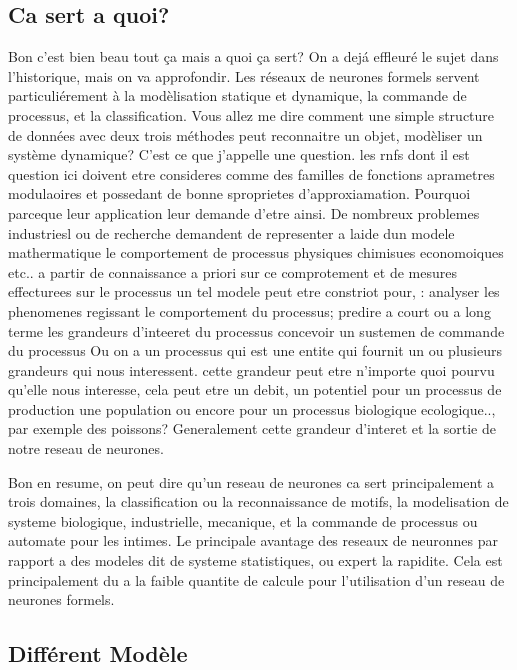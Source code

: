 \documentclass[a4paper,12pt]{report}
\begin{document}
\subsection{Ca sert a quoi?}
Bon c'est bien beau tout \c ca mais a quoi  \c ca sert? On a
dej\'a effleur\'e le sujet dans l'historique, mais on va
approfondir. Les r\'eseaux de neurones formels servent
particuli\'erement \`a la mod\`elisation statique et dynamique, la
commande de processus, et la classification. Vous allez me dire
comment une simple structure de donn\'ees avec deux trois m\'ethodes
peut reconnaitre un objet, mod\`eliser un syst\`eme dynamique? C'est
ce que j'appelle une question.
les rnfs dont il est question ici doivent etre consideres comme des familles de fonctions aprametres
modulaoires et possedant de bonne sproprietes
d'approxiamation. Pourquoi parceque leur application leur demande
d'etre ainsi.
De nombreux problemes industriesl ou de recherche demandent de
representer a laide dun modele mathermatique le comportement de
processus physiques chimisues economoiques etc.. a partir de
connaissance a priori sur ce comprotement et de mesures effecturees
sur le processus un tel modele peut etre constriot pour, :
analyser les phenomenes regissant le comportement du processus;
predire a court ou a long terme les grandeurs d'inteeret du processus
concevoir un sustemen de commande du processus
Ou on a un processus qui est une entite qui fournit un ou plusieurs
grandeurs qui nous interessent. cette grandeur peut etre n'importe
quoi pourvu qu'elle nous interesse, cela peut etre un debit, un
potentiel pour un processus de production une population ou encore
pour un processus biologique ecologique.., par exemple des poissons?
Generalement cette grandeur d'interet et la sortie de notre reseau de
neurones.

Bon en resume, on peut dire qu'un reseau de neurones ca sert
principalement a trois domaines, la classification ou la
reconnaissance de motifs, la modelisation de systeme biologique,
industrielle, mecanique, et la commande de processus ou automate pour
les intimes. Le principale avantage des reseaux de neuronnes par
rapport a des modeles dit de systeme statistiques, ou expert la
rapidite. Cela est principalement du a la faible quantite de calcule
pour l'utilisation  d'un reseau de neurones formels.
\subsection{Diff\'erent Mod\`ele}
\end{document}
